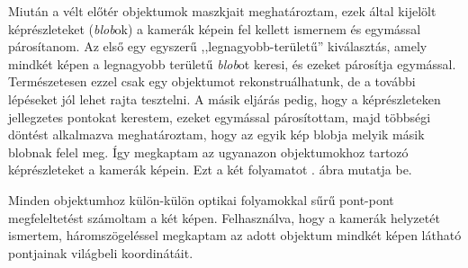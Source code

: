 Miután a vélt előtér objektumok maszkjait meghatároztam, ezek által kijelölt képrészleteket (\textit{blob}ok) a kamerák képein fel kellett ismernem és egymással párosítanom. Az első egy egyszerű ,,legnagyobb-területű'' kiválasztás, amely mindkét képen a legnagyobb területű \textit{blob}ot keresi, és ezeket párosítja egymással. Természetesen ezzel csak egy objektumot rekonstruálhatunk, de a további lépéseket jól lehet rajta tesztelni. A másik eljárás pedig, hogy a képrészleteken jellegzetes pontokat kerestem, ezeket egymással párosítottam, majd többségi döntést alkalmazva meghatároztam, hogy az egyik kép blobja melyik másik blobnak felel meg. Így megkaptam az ugyanazon objektumokhoz tartozó képrészleteket a kamerák képein. Ezt a két folyamatot . ábra mutatja be.


Minden objektumhoz külön-külön optikai folyamokkal sűrű pont-pont megfeleltetést számoltam a két képen. Felhasználva, hogy a kamerák helyzetét ismertem, háromszögeléssel megkaptam az adott objektum mindkét képen látható pontjainak világbeli koordinátáit.


